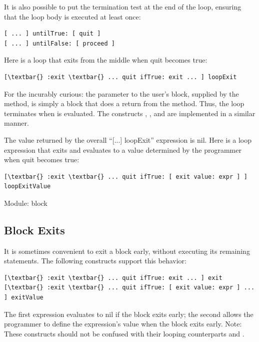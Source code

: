 \documentclass[letterpaper,10pt,english]{sphinxmanual}
\begin{document}
It is also possible to put the termination test at the end of the loop, ensuring that the loop body is
executed at least once:

\begin{Verbatim}[commandchars=\\\{\}]
[ ... ] untilTrue: [ quit ]
[ ... ] untilFalse: [ proceed ]
\end{Verbatim}

Here is a loop that exits from the middle when quit becomes true:

\begin{Verbatim}[commandchars=\\\{\}]
[\textbar{} :exit \textbar{} ... quit ifTrue: exit ... ] loopExit
\end{Verbatim}

For the incurably curious: the parameter to the user’s block, supplied by the  method, is simply a block that
does a return from the  method. Thus, the loop terminates when  is evaluated. The constructs
, , and  are implemented in a similar manner.

The value returned by the overall “{[}...{]} loopExit” expression is nil. Here is a loop expression
that exits and evaluates to a value determined by the programmer when quit becomes true:

\begin{Verbatim}[commandchars=\\\{\}]
[\textbar{} :exit \textbar{} ... quit ifTrue: [ exit value: expr ] ] loopExitValue
\end{Verbatim}

Module: block


\subsection{Block Exits}
\label{blocks:block-exits}
It is sometimes convenient to exit a block early, without executing its remaining statements. The
following constructs support this behavior:

\begin{Verbatim}[commandchars=\\\{\}]
[\textbar{} :exit \textbar{} ... quit ifTrue: exit ... ] exit
[\textbar{} :exit \textbar{} ... quit ifTrue: [ exit value: expr ] ... ] exitValue
\end{Verbatim}

The first expression evaluates to nil if the block exits early; the second allows the programmer to
define the expression’s value when the block exits early. Note: These constructs should not be confused
with their looping counterparts  and .
\end{document}
